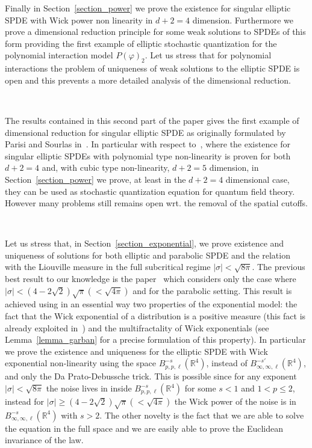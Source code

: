 \documentclass[a4paper,10pt]{article}
\begin{document}
Finally in Section~\ref{section_power} we prove the existence for singular
elliptic SPDE with Wick power non linearity in $d + 2 = 4$ dimension.
Furthermore we prove a dimensional reduction principle for some weak solutions
to SPDEs of this form providing the first example of elliptic stochastic
quantization for the polynomial interaction model $P (\varphi)_2$. Let us
stress that for polynomial interactions the problem of uniqueness of weak
solutions to the elliptic SPDE is open and this prevents a more detailed
analysis of the dimensional reduction.

\

The results contained in this second part of the paper gives the first
example of dimensional reduction for singular elliptic SPDE as originally
formulated by Parisi and Sourlas in~{\cite{parisi_random_1979}}. In particular
with respect to~{\cite{GH18}}, where the existence for singular elliptic SPDEs
with polynomial type non-linearity is proven for both $d + 2 = 4$ and, with
cubic type non-linearity, $d + 2 = 5$ dimension, in
Section~\ref{section_power} we prove, at least in the $d + 2 = 4$ dimensional
case, they can be used as stochastic quantization equation for quantum field
theory. However many problems still remains open wrt. the removal of the
spatial cutoffs.

\

Let us stress that, in Section~\ref{section_exponential}, we prove existence
and uniqueness of solutions for both elliptic and parabolic SPDE and the
relation with the Liouville measure in the full subcritical regime $| \sigma |
< \sqrt{8 \pi}$. The previous best result to our knowledge is the
paper~{\cite{Garban2018}} which considers only the case where $| \sigma | <
\left( 4 - 2 \sqrt{2} \right) \sqrt{\pi} \left( < \sqrt{4 \pi} \right)$ and
for the parabolic setting. This result is achieved using in an essential way
two properties of the exponential model: the fact that the Wick exponential of
a distribution is a positive measure (this fact is already exploited
in~{\cite{Garban2018}}) and the multifractality of Wick exponentials (see
Lemma~\ref{lemma_garban} for a precise formulation of this property). In
particular we prove the existence and uniqueness for the elliptic SPDE with
Wick exponential non-linearity using the space $B^{- s}_{p, p, \ell}
(\mathbb{R}^4)$, instead of $B^{- s'}_{\infty, \infty, \ell} (\mathbb{R}^4)$,
and only the Da Prato-Debussche trick. This is possible since for any exponent
$| \sigma | < \sqrt{8 \pi}$ the noise lives in inside $B^{- s}_{p, p, \ell}
(\mathbb{R}^4)$ for some $s < 1$ and $1 < p \leqslant 2$, instead for $|
\sigma | \geqslant \left( 4 - 2 \sqrt{2} \right) \sqrt{\pi} \left( < \sqrt{4
\pi} \right)$ the Wick power of the noise is in $B^{- s}_{\infty, \infty,
\ell} (\mathbb{R}^4)$ with $s > 2$. The other novelty is the fact that we are
able to solve the equation in the full space and we are easily able to prove
the Euclidean invariance of the law.
\end{document}
